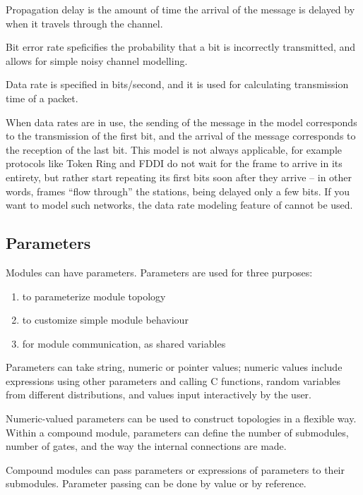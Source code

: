 Propagation delay is the amount of time the arrival of
the message is delayed by when it travels through the channel.

Bit error rate speficifies the probability that a bit is incorrectly
transmitted, and allows for simple noisy channel modelling.

Data rate is specified in bits/second, and it is used for calculating
transmission time of a packet.

When data rates are in use, the sending of the message in the model
corresponds to the transmission of the first bit, and
the arrival of the message corresponds to the reception
of the last bit. This model is not always applicable,
for example protocols like Token Ring and FDDI do not wait
for the frame to arrive in its entirety, but rather start repeating
its first bits soon after they arrive -- in other words,
frames ``flow through'' the stations, being delayed only a few bits.
If you want to model such networks, the data rate modeling feature
of {\opp} cannot be used.



\subsection{Parameters}

Modules can have parameters. Parameters are used for three purposes:
\begin{enumerate}
  \item{to parameterize module topology}
  \item{to customize simple module behaviour}
  \item{for module communication, as shared variables}
\end{enumerate}

Parameters can take string, numeric or pointer values; numeric
values include expressions using other parameters and calling
C functions, random variables from different distributions, and
values input interactively by the user.


Numeric-valued parameters can be used to construct topologies in a
flexible way. Within a compound module, parameters can define the
number of submodules, number of gates, and the way the internal
connections are made.


Compound modules can pass parameters or expressions of parameters
to their submodules. Parameter passing can be done by value or
by reference.

